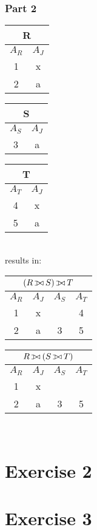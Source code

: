 \documentclass[11pt,a4paper]{scrartcl}
\def\ojoin{\setbox0=\hbox{$\bowtie$}%
  \rule[-.02ex]{.25em}{.4pt}\llap{\rule[\ht0]{.25em}{.4pt}}}
\def\leftouterjoin{\mathbin{\ojoin\mkern-5.8mu\bowtie}}
\begin{document}
\subsubsection*{Part 2}

\begin{minipage}{.2\textwidth}
\begin{tabular}{|c|c|}
\hline
  \multicolumn{2}{|c|}{R} \\
  \hline
  $A_R$ & $A_J$\\ \hline \hline
  1 & x\\
  2 & a\\
  \hline
\end{tabular}
\end{minipage}
\begin{minipage}{.2\textwidth}
\begin{tabular}{|c|c|}
\hline
  \multicolumn{2}{|c|}{S} \\
  \hline
  $A_S$ & $A_J$\\ \hline \hline
  3 & a\\
  \hline
\end{tabular}
\end{minipage}
\begin{minipage}{.2\textwidth}
\begin{tabular}{|c|c|}
\hline
  \multicolumn{2}{|c|}{T} \\
  \hline
  $A_T$ & $A_J$\\ \hline \hline
  4 & x\\
  5 & a\\
  \hline
\end{tabular}
\end{minipage}\\

results in:\\

\begin{minipage}{.3\textwidth}
\begin{tabular}{|c|c|c|c|}
\hline
  \multicolumn{4}{|c|}{$(R \leftouterjoin S)\leftouterjoin T$} \\
  \hline
  $A_R$ & $A_J$ & $A_S$ & $A_T$\\ \hline \hline
  1 & x & & 4\\
  2 & a & 3 & 5\\
  \hline
\end{tabular}
\end{minipage}
\begin{minipage}{.3\textwidth}
\begin{tabular}{|c|c|c|c|}
\hline
  \multicolumn{4}{|c|}{$R \leftouterjoin (S\leftouterjoin T)$} \\
  \hline
$A_R$ & $A_J$ & $A_S$ & $A_T$\\ \hline \hline
  1 & x & & \\
  2 & a & 3 & 5\\
  \hline
\end{tabular}
\end{minipage}\\


\section*{Exercise 2}

\section*{Exercise 3}
\end{document}
